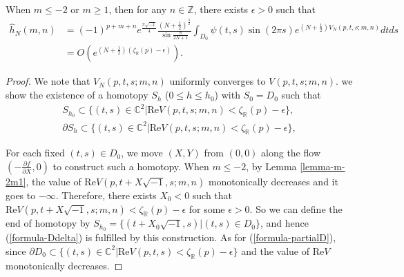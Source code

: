 \documentclass[12pt]{amsart}
\begin{document}
\begin{proposition} \label{prop-mgeq1-leg-2}
    When $m\leq -2$ or $m\geq 1$, then for any $n\in \mathbb{Z}$, there exists $\epsilon>0$ such that 
    \begin{align}
        \hat{h}_{N}(m,n)&=(-1)^{p+m+n}e^{\frac{\pi\sqrt{-1}}{4}}\frac{\left(N+\frac{1}{2}\right)^{\frac{3}{2}}}{\sin\frac{\pi}{2N+1}}\int_{D_0}\psi(t,s)\sin(2\pi s)e^{(N+\frac{1}{2})V_N(p,t,s;m,n)}dtds\\\nonumber
        &=O\left(e^{(N+\frac{1}{2})(\zeta_{\mathbb{R}}(p)-\epsilon)}\right).
    \end{align}
\end{proposition}
\begin{proof}
    We note that $V_N(p,t,s;m,n)$ uniformly converges to $V(p,t,s;m,n)$.
we show the existence of a homotopy $S_{h}$ ($0\leq h\leq h_0$) with $S_0=D_0$ such that
\begin{align}
        S_{h_0}\subset \{(t,s)\in \mathbb{C}^2| \text{Re} V(p,t,s;m,n)<\zeta_{\mathbb{R}}(p)-\epsilon\},  \label{formula-Ddelta}\\ 
        \partial S_{h}\subset \{(t,s)\in \mathbb{C}^2| \text{Re} V(p,t,s;m,n)<\zeta_{\mathbb{R}}(p)-\epsilon\}, \label{formula-partialD}
    \end{align}

    
    For each fixed $(t,s)\in D_0$,  we move $(X,Y)$ from $(0,0)$ along the flow $(-\frac{\partial f}{\partial X},0)$ to construct such a homotopy. When $m\leq -2$, by Lemma \ref{lemma-m-2m1}, the value of $\text{Re} V(p,t+X\sqrt{-1},s;m,n)$ monotonically decreases and it goes to $-\infty$. Therefore, there exists $X_0<0$ such that $\text{Re} V(p,t+X\sqrt{-1},s;m,n)<\zeta_{\mathbb{R}}(p)-\epsilon$ for some $\epsilon>0$. 
    So we can define the end of homotopy by $S_{h_0}=\{(t+X_0\sqrt{-1},s)|(t,s)\in D_0\}$, 
   and hence (\ref{formula-Ddelta}) is fulfilled by this construction. 
    As for (\ref{formula-partialD}), since $\partial D_0\subset \{(t,s)\in \mathbb{C}^2| \text{Re} V(p,t,s)<\zeta_{\mathbb{R}}(p)-\epsilon\}$ and the value of $\text{Re} V$ monotonically decreases. 
\end{proof}
\end{document}

